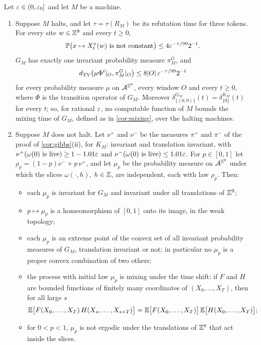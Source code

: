 \begin{corollary}\label{cor:stack}
Let $\varepsilon\in(0,\varepsilon_0]$ and let $M$ be a machine.
\begin{enumerate}[label=\textup{(\roman*)}]
\item Suppose $M$ halts, and let $\tau=\tau(R_M)$ be its refutation time for three tokens. For every site $w\in\mathbb{Z}^9$ and every $t\ge0$,
\[
\mathbb{P}\bigl(x\mapsto X^x_t(w)\text{ is not constant}\bigr)\le4\varepsilon^{-\tau/99}2^{-t}.
\]
$G_M$ has exactly one invariant probability measure $\pi^G_M$, and
\[
d_{\mathrm{TV}}\bigl(\mu\Phi^t|_O,\pi^G_M|_O\bigr)\le8|O|\,\varepsilon^{-\tau/99}2^{-t}
\]
for every probability measure $\mu$ on $\mathcal{A}^{\mathbb{Z}^9}$, every window $O$ and every $t\ge0$, where $\Phi$ is the transition operator of $G_M$. Moreover $\delta^{G_M}_{\{(0,0)\}}(t)=\delta^{K_M}_{\{0\}}(t)$ for every $t$; so, for rational $\varepsilon$, no computable function of $M$ bounds the mixing time of $G_M$, defined as in \cref{cor:mixing}, over the halting machines.
\item Suppose $M$ does not halt. Let $\nu^+$ and $\nu^-$ be the measures $\pi^+$ and $\pi^-$ of the proof of \cref{cor:gibbs}(ii), for $K_M$: invariant and translation invariant, with $\nu^+(\omega(0)\text{ is live})\ge1-1.01\varepsilon$ and $\nu^-(\omega(0)\text{ is live})\le1.01\varepsilon$. For $p\in[0,1]$ let $\rho_p=(1-p)\nu^-+p\,\nu^+$, and let $\mu_p$ be the probability measure on $\mathcal{A}^{\mathbb{Z}^9}$ under which the slices $\omega(\cdot,h)$, $h\in\mathbb{Z}$, are independent, each with law $\rho_p$. Then:
\begin{itemize}
\item[(a)] each $\mu_p$ is invariant for $G_M$ and invariant under all translations of $\mathbb{Z}^9$;
\item[(b)] $p\mapsto\mu_p$ is a homeomorphism of $[0,1]$ onto its image, in the weak topology;
\item[(c)] each $\mu_p$ is an extreme point of the convex set of all invariant probability measures of $G_M$, translation invariant or not; in particular no $\mu_p$ is a proper convex combination of two others;
\item[(d)] the process with initial law $\mu_p$ is mixing under the time shift: if $F$ and $H$ are bounded functions of finitely many coordinates of $(X_0,\dots,X_T)$, then for all large $s$
\[
\mathbb{E}\bigl[F(X_0,\dots,X_T)\,H(X_s,\dots,X_{s+T})\bigr]=\mathbb{E}\bigl[F(X_0,\dots,X_T)\bigr]\,\mathbb{E}\bigl[H(X_0,\dots,X_T)\bigr];
\]
\item[(e)] for $0<p<1$, $\mu_p$ is not ergodic under the translations of $\mathbb{Z}^8$ that act inside the slices.

\end{itemize}
\end{enumerate}
\end{corollary}
